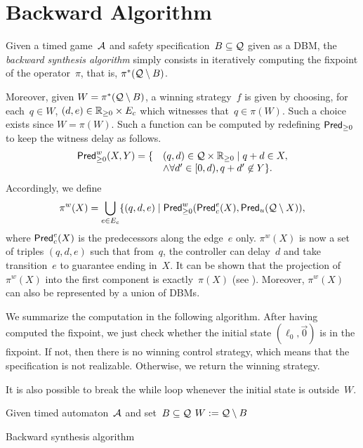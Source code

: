 \documentclass{article}
\begin{document}
\section{Backward Algorithm}
Given a timed game~$\mathcal{A}$ and safety specification~$B \subseteq \mathcal{Q}$ given as a
DBM, the \emph{backward synthesis algorithm} simply consists in iteratively
computing the fixpoint of the operator~$\pi$, that is, $\pi^*(\mathcal{Q}\setminus
B)$.

Moreover, given $W = \pi^*(\mathcal{Q}\setminus B)$, a winning strategy~$f$ is given
by choosing, for each~$q \in W$, $(d,e) \in \mathbb{R}_{\geq 0} \times E_c$ which witnesses
that~$q \in \pi(W)$. Such a choice exists since $W = \pi(W)$.
Such a function can be computed by redefining $\textrm{\sf Pred}_{\geq 0}$ to keep the witness delay
as follows.
\[
  \begin{array}{rl}
    \textrm{\sf Pred}_{\geq 0}^w(X,Y) = \{&(q,d) \in \mathcal{Q} \times \mathbb{R}_{\geq 0} \mid q+d \in X,\\
      & \land \forall d' \in[0,d), q+d' \not \in Y\}.
  \end{array}
\]
Accordingly, we define
\[
  \pi^w(X) = \bigcup_{e \in E_c} \{ (q,d,e) \mid 
      \textrm{\sf Pred}_{\geq 0}^w(\textrm{\sf Pred}_c^e(X), \textrm{\sf Pred}_u(\mathcal{Q} \setminus X)),
\]
where $\textrm{\sf Pred}_c^e(X)$ is the predecessors along the edge~$e$ only.
$\pi^w(X)$ is now a set of triples $(q,d,e)$ such that from~$q$,
the controller can delay~$d$ and take transition~$e$ to guarantee ending in~$X$.
It can be shown that the projection of $\pi^w(X)$ into the first component is
exactly~$\pi(X)$ (see \cite{Cassez05}).
Moreover, $\pi^w(X)$ can also be represented by a union of DBMs.

We summarize the computation in the following algorithm. After having computed
the fixpoint, we just check whether the initial state $(\ell_0,\vec{0})$ is
in the fixpoint. If not, then there is no winning control strategy, which means
that the specification is not realizable. Otherwise, we return the winning
strategy.

It is also possible to break the while loop whenever the initial state is
outside~$W$.
\begin{algorithm}
   \small
   Given timed automaton~$\mathcal{A}$ and set~$B\subseteq \mathcal{Q}$\;
   $W := \mathcal{Q} \setminus B$\;
   \caption{Backward synthesis algorithm}
\end{algorithm}
\end{document}
